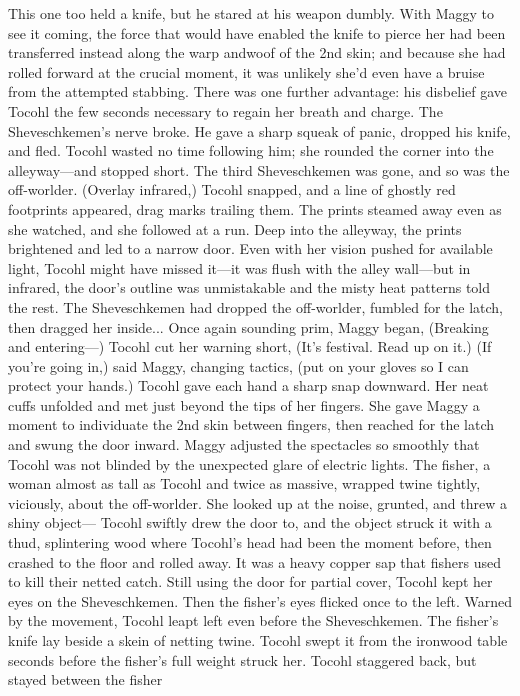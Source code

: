 \documentclass[9pt]{article}
\begin{document}
This one too held a knife, but he stared at his weapon dumbly. With Maggy to see it coming, the
force that would have enabled the knife to pierce her had been transferred instead along the warp andwoof of the 2nd skin; and because she had rolled forward at the crucial moment, it was unlikely she’d
even have a bruise from the attempted stabbing.
There was one further advantage: his disbelief gave Tocohl the few seconds necessary to regain her
breath and charge. The Sheveschkemen’s nerve broke. He gave a sharp squeak of panic, dropped his
knife, and fled.
Tocohl wasted no time following him; she rounded the corner into the alleyway—and stopped short.
The third Sheveschkemen was gone, and so was the off-worlder.
(Overlay infrared,) Tocohl snapped, and a line of ghostly red footprints appeared, drag marks trailing
them. The prints steamed away even as she watched, and she followed at a run.
Deep into the alleyway, the prints brightened and led to a narrow door. Even with her vision pushed
for available light, Tocohl might have missed it—it was flush with the alley wall—but in infrared, the
door’s outline was unmistakable and the misty heat patterns told the rest. The Sheveschkemen had
dropped the off-worlder, fumbled for the latch, then dragged her inside...
Once again sounding prim, Maggy began, (Breaking and entering—)
Tocohl cut her warning short, (It’s festival. Read up on it.)
(If you’re going in,) said Maggy, changing tactics, (put on your gloves so I can protect your hands.)
Tocohl gave each hand a sharp snap downward. Her neat cuffs unfolded and met just beyond the
tips of her fingers. She gave Maggy a moment to individuate the 2nd skin between fingers, then reached
for the latch and swung the door inward.
Maggy adjusted the spectacles so smoothly that Tocohl was not blinded by the unexpected glare of
electric lights.
The fisher, a woman almost as tall as Tocohl and twice as massive, wrapped twine tightly, viciously,
about the off-worlder. She looked up at the noise, grunted, and threw a shiny object—
Tocohl swiftly drew the door to, and the object struck it with a thud, splintering wood where
Tocohl’s head had been the moment before, then crashed to the floor and rolled away. It was a heavy
copper sap that fishers used to kill their netted catch.
Still using the door for partial cover, Tocohl kept her eyes on the Sheveschkemen.
Then the fisher’s eyes flicked once to the left. Warned by the movement, Tocohl leapt left even
before the Sheveschkemen.
The fisher’s knife lay beside a skein of netting twine. Tocohl swept it from the ironwood table
seconds before the fisher’s full weight struck her. Tocohl staggered back, but stayed between the fisher
\end{document}
